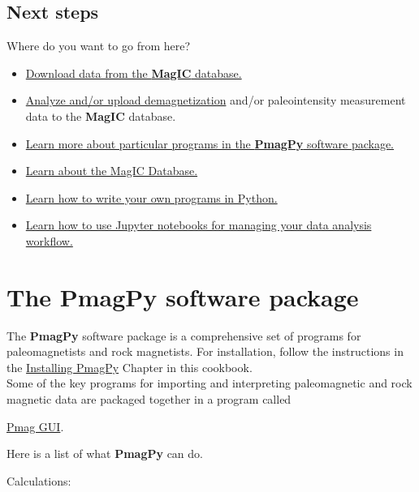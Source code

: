 \documentclass[11pt]{book}
\begin{document}
{
\section{Next steps}

Where do you want to go from here?

\begin{itemize}
\item \href{#magic_download}{Download data from the {\bf MagIC} database.}
\item \href{#pmag_gui.py}{Analyze and/or upload demagnetization} and/or paleointensity measurement data to the {\bf MagIC} database.
\item \href{#PmagPy}{Learn more about particular programs in the {\bf PmagPy} software package.}
\item \href{#MagICDatabase}{Learn about the MagIC Database.}
\item \href{#Python}{Learn how to write your own programs in Python.}
\item \href{#Notebooks}{Learn how to use Jupyter notebooks for managing your data analysis workflow.}
\end{itemize}



\chapter{The {\bf PmagPy} software package}
\label{chap:PmagPy}

The {\bf PmagPy} software package is a comprehensive set of programs for paleomagnetists and rock magnetists.  For installation,  follow the instructions in the \href{#quick_start}{Installing PmagPy} Chapter in this cookbook. \\

Some of the key programs for importing and interpreting paleomagnetic and rock magnetic data are packaged together in a program called {\href{#pmag_gui.py}{Pmag GUI}.

Here is a list of what {\bf PmagPy} can do.

Calculations:

\begin{itemize}


\end{itemize}}}
\end{document}
